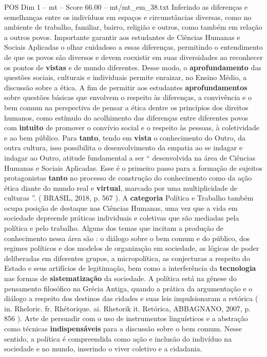 \begin{textsample}{POS Dim 1 – mt – Score 66.00 – mt/mt\_em\_38.txt}
Inferindo as diferenças e semelhanças entre os indivíduos em espaços e circunstâncias diversas, como no ambiente de trabalho, familiar, bairro, religião e outros, como também em relação a outros povos.
Importante garantir aos estudantes de Ciências Humanas e Sociais Aplicadas o olhar cuidadoso a essas diferenças, permitindo o entendimento de que os povos são diversos e devem coexistir em suas diversidades ao reconhecer os pontos de \textbf{vistas} e de mundo diferentes.
Desse modo, o \textbf{aprofundamento} das questões sociais, culturais e individuais permite enraizar, no Ensino Médio, a discussão sobre a ética.
A fim de permitir aos estudantes \textbf{aprofundamentos} sobre questões básicas que envolvem o respeito às diferenças, a convivência e o bem comum na perspectiva de pensar a ética dentre os princípios dos direitos humanos, como estímulo do acolhimento das diferenças entre diferentes povos com \textbf{intuito} de promover o convívio social e o respeito às pessoas, à coletividade e ao bem público.
Para \textbf{tanto}, tendo em \textbf{vista} o conhecimento do Outro, da outra cultura, isso possibilita o desenvolvimento da empatia ao se indagar e indagar ao Outro, atitude fundamental a ser “ desenvolvida na área de Ciências Humanas e Sociais Aplicadas.
Esse é o primeiro passo para a formação de sujeitos protagonistas \textbf{tanto} no processo de construção do conhecimento como da ação ética diante do mundo real e \textbf{virtual}, marcado por uma multiplicidade de culturas ”. ( BRASIL, 2018, p. 567 ).
A \textbf{categoria} Política e Trabalho também ocupa posição de destaque nas Ciências Humanas, uma vez que a vida em sociedade depreende práticas individuais e coletivas que são mediadas pela política e pelo trabalho.
Alguns dos temas que incitam a produção de conhecimento nessa área são : o diálogo sobre o bem comum e do público, dos regimes políticos e dos modelos de organização em sociedade, as lógicas de poder deliberadas em diferentes grupos, a micropolítica, as conjecturas a respeito do Estado e seus artifícios de legitimação, bem como a interferência da \textbf{tecnologia} nas formas de \textbf{sistematização} da sociedade.
A política está na gênese do pensamento filosófico na Grécia Antiga, quando a prática da argumentação e o diálogo a respeito dos destinos das cidades e suas leis impulsionaram a retórica ( in.
Rheloric. fr.
Rhétorique. ai.
Rhetorik it.
Retórica, ABBAGNANO, 2007, p. 856 ).
Arte de persuadir com o uso de instrumentos linguísticos e a abstração como técnicas \textbf{indispensáveis} para a discussão sobre o bem comum.
Nesse sentido, a política é compreendida como ação e inclusão do indivíduo na sociedade e no mundo, inserindo o viver coletivo e a cidadania.

\end{textsample}
